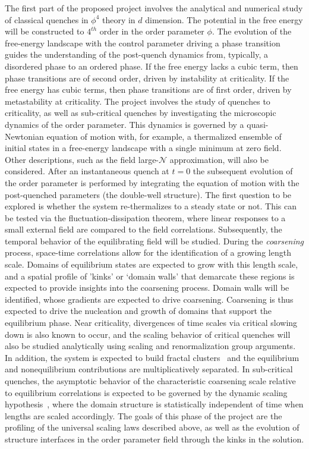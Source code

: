 \documentclass[a4paper,11pt,color]{article}
\begin{document}
The first part of the proposed project involves the analytical and numerical study of classical quenches in $\phi^4$ theory in  {$d$} 
dimension. The potential in the free energy will be constructed to $4^{th}$ order in the order parameter $\phi$. The evolution of the free-energy landscape with the control parameter driving a phase transition guides the understanding of the post-quench dynamics from, typically, a disordered phase to an ordered phase. If the free energy lacks a cubic term, then phase transitions are of second order, driven by instability at criticality. If the free energy has cubic terms, then phase transitions are of first order, driven by metastability at criticality. The project involves the study of quenches to criticality, as well as sub-critical quenches by investigating the microscopic dynamics of the order parameter. This dynamics is governed by a quasi-Newtonian equation of motion with,  {for example, 
a thermalized ensemble of initial states in a free-energy landscape with a single minimum at zero field}. Other descriptions, such as the field 
large-$\mathcal{N}$ approximation, will also be considered. After an instantaneous quench at $t=0$ the subsequent evolution of the order parameter is performed by integrating the equation of motion with the post-quenched parameters  {(the double-well structure)}. The first question to be explored is whether the system re-thermalizes to a steady state or not. This can be tested via the fluctuation-dissipation theorem, where linear responses to a small external field are compared to the field correlations. Subsequently, the temporal behavior of the equilibrating field will be studied. During the \textit{coarsening} process, space-time correlations allow for the identification of a growing length scale. Domains of equilibrium states are expected to grow with this length scale, and a spatial profile of 'kinks' or  {`domain walls'} that demarcate these regions is expected to provide insights into the coarsening process. Domain walls will be identified, whose gradients are expected to 
drive coarsening. Coarsening is thus expected to drive the nucleation and growth of domains that support the equilibrium phase. Near criticality, divergences of time scales via critical slowing down is also known to occur, and the scaling behavior of critical quenches will also be studied analytically using scaling and renormalization group arguments. In addition, the system is expected to build fractal clusters~\cite{fractal}
and the equilibrium and nonequilibrium contributions are multiplicatively separated. In sub-critical quenches, the asymptotic behavior of the characteristic coarsening scale relative to equilibrium correlations is expected to be governed by the dynamic scaling hypothesis~\cite{dynscal}, where the domain structure is statistically independent of time when lengths are scaled accordingly. The goals of this phase of the project are the profiling of the universal scaling laws described above, as well as the evolution of structure interfaces in the order parameter field through the kinks in the solution.
\end{document}
